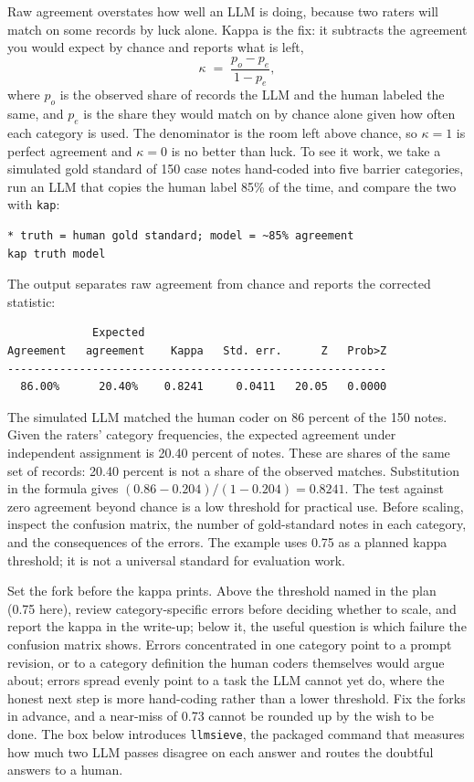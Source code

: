 Raw agreement overstates how well an LLM is doing, because two raters will match on some records by luck alone. Kappa is the fix: it subtracts the agreement you would expect by chance and reports what is left,
\[
\kappa \;=\; \frac{p_o - p_e}{1 - p_e},
\]
where $p_o$ is the observed share of records the LLM and the human labeled the same, and $p_e$ is the share they would match on by chance alone given how often each category is used. The denominator is the room left above chance, so $\kappa=1$ is perfect agreement and $\kappa=0$ is no better than luck. To see it work, we take a simulated gold standard of 150 case notes hand-coded into five barrier categories, run an LLM that copies the human label 85\% of the time, and compare the two with \texttt{kap}:
\par
{\footnotesize
\begin{verbatim}
* truth = human gold standard; model = ~85% agreement
kap truth model
\end{verbatim}
}
The output separates raw agreement from chance and reports the corrected statistic:
\par
{\footnotesize
\begin{verbatim}
             Expected
Agreement   agreement    Kappa   Std. err.      Z   Prob>Z
----------------------------------------------------------
  86.00%      20.40%    0.8241     0.0411   20.05   0.0000
\end{verbatim}
}
The simulated LLM matched the human coder on 86 percent of the 150 notes. Given the raters' category frequencies, the expected agreement under independent assignment is 20.40 percent of notes. These are shares of the same set of records: 20.40 percent is not a share of the observed matches. Substitution in the formula gives $(0.86-0.204)/(1-0.204)=0.8241$. The test against zero agreement beyond chance is a low threshold for practical use. Before scaling, inspect the confusion matrix, the number of gold-standard notes in each category, and the consequences of the errors. The example uses 0.75 as a planned kappa threshold; it is not a universal standard for evaluation work.

Set the fork before the kappa prints. Above the threshold named in the plan (0.75 here), review category-specific errors before deciding whether to scale, and report the kappa in the write-up; below it, the useful question is which failure the confusion matrix shows. Errors concentrated in one category point to a prompt revision, or to a category definition the human coders themselves would argue about; errors spread evenly point to a task the LLM cannot yet do, where the honest next step is more hand-coding rather than a lower threshold. Fix the forks in advance, and a near-miss of 0.73 cannot be rounded up by the wish to be done. The box below introduces \texttt{llmsieve}, the packaged command that measures how much two LLM passes disagree on each answer and routes the doubtful answers to a human.


